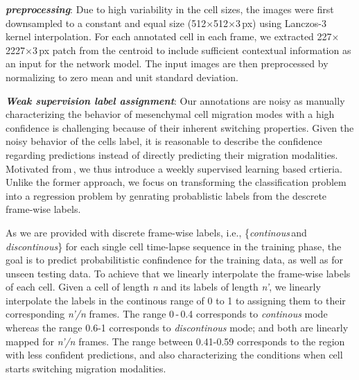 \documentclass{article}
\begin{document}
\textit{\textbf{preprocessing}}: 
Due to high variability in the cell sizes, the images were first downsampled to 
a constant and equal size (512$\times$512$\times$3\,px) using Lanczos-3 kernel 
interpolation. 
For each annotated cell in each frame, we extracted 227$\times$2227$\times$3\,px 
patch from the centroid to include sufficient contextual information as an input 
for the network model.
The input images are then preprocessed by normalizing to zero mean and unit 
standard deviation. 

\textit{\textbf{Weak supervision label assignment}}: 
Our annotations are noisy as manually characterizing the behavior of mesenchymal cell migration 
modes with a high confidence is challenging because of their inherent switching properties. 
Given the noisy behavior of the cells label, it is reasonable to describe the confidence regarding
predictions instead of directly predicting their migration modalities.
Motivated from\,\cite{ding2018weakly}, we thus introduce a weekly supervised learning based crtieria.
Unlike the former approach, we focus on transforming the classification problem into a regression 
problem by genrating probablistic labels from the descrete frame-wise labels.

As we are provided with discrete frame-wise labels, i.e., 
\{\textit{continous}\,and\,\textit{discontinous}\} for each single cell time-lapse sequence
in the training phase, the goal is to predict probabilitistic confindence for the training 
data, as well as for unseen testing data. To achieve that we linearly interpolate the frame-wise
labels of each cell.
Given a cell of length \textit{n} and its labels of length \textit{n'}, we linearly interpolate the 
labels in the continous range of 0 to 1 to assigning them to their corresponding 
\textit{n'/n} frames. 
The range 0\,-\,0.4 corresponds to \textit{continous} mode whereas the range 0.6-1 corresponds to
\textit{discontinous} mode; and both are linearly mapped for \textit{n'/n} frames.
The range between 0.41-0.59 corresponds to the region with less confident predictions, and also
characterizing the conditions when cell starts switching migration modalities.
\end{document}

